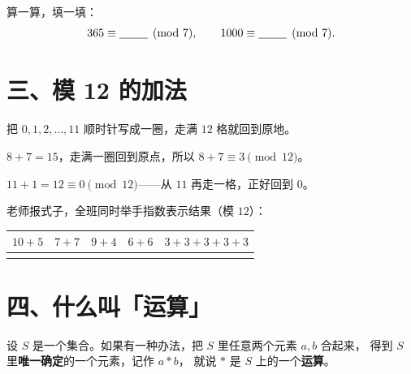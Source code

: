 \begin{dongshou}
  算一算，填一填：
  \[
    365\equiv \underline{\hspace{2.5em}} \pmod 7, \qquad
    1000\equiv \underline{\hspace{2.5em}} \pmod 7 .
  \]
\end{dongshou}

\section*{三、模 12 的加法}

\noindent 把 \(0,1,2,\dots,11\) 顺时针写成一圈，走满 \(12\) 格就回到原地。


\begin{example}
  \(8+7=15\)，走满一圈回到原点，所以 \(8+7\equiv3\pmod{12}\)。

  \(11+1=12\equiv0\pmod{12}\)——从 \(11\) 再走一格，正好回到 \(0\)。
\end{example}

\begin{dongshou}[用手指回答]
  老师报式子，全班同时举手指数表示结果（模 \(12\)）：
  \begin{center}
  \begin{tabular}{@{}lcccc@{}}
    \toprule
    \(10+5\) & \(7+7\) & \(9+4\) & \(6+6\) & \(3+3+3+3+3\) \\
    \midrule
    \hspace{2em} & \hspace{2em} & \hspace{2em} & \hspace{2em} & \hspace{2em} \\
    \bottomrule
  \end{tabular}
  \end{center}
\end{dongshou}

\section*{四、什么叫「运算」}

\begin{definition}[运算]
  设 \(S\) 是一个集合。如果有一种办法，把 \(S\) 里任意两个元素 \(a,b\) 合起来，
  得到 \(S\) 里\textbf{唯一确定}的一个元素，记作 \(a*b\)，
  就说 \(*\) 是 \(S\) 上的一个\textbf{运算}。
\end{definition}

